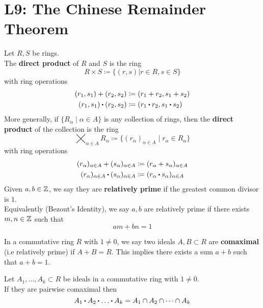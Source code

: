 \documentclass[../Main.tex]{subfiles}
\begin{document}
\chapter{L9: The Chinese Remainder Theorem}
\begin{dfn}[title = Direct Product]
	Let $R,S$ be rings.\\
	The \textbf{direct product} of $R$ and $S$ is the ring
	\[R\times S \coloneqq \{(r,s)|r\in R, s\in S \}\]
	with ring operations
	\begin{align*}
		(r_1,s_1)+(r_2,s_2)&\coloneqq (r_1+r_2,s_1+s_2)\\
		(r_1,s_1)\rdot (r_2,s_2)&\coloneqq (r_1\rdot r_2,s_1\rdot s_2)
	\end{align*}
	More generally, if $\{R_\alpha\mid \alpha\in A\}$ is any collection of rings, then the \textbf{direct product} of the collection is the ring
	\[\bigtimes_{\alpha \in A}R_\alpha \coloneqq \{(r_\alpha)_{\alpha\in A}\mid  r_\alpha \in R_\alpha\}\]
	with ring operations
	\begin{align*}
	(r_\alpha)_{\alpha\in A}+(s_\alpha)_{\alpha\in A}&\coloneqq (r_\alpha +s_\alpha)_{\alpha\in A}\\
	(r_\alpha)_{\alpha\in A}\rdot (s_\alpha)_{\alpha\in A}&\coloneqq (r_\alpha \rdot s_\alpha)_{\alpha\in A}
	\end{align*}
	Given $a,b\in \mathbb{Z}$, we say they are \textbf{relatively prime} if the greatest common divisor is $1$.\\
	Equivalently (Bezout's Identity), we say $a,b$ are relatively prime if there exists $m,n\in\mathbb{Z}$ such that \[am+bn=1\]
\end{dfn}
\begin{dfn}[title = Comaximal Ideals]
	In a commutative ring $R$ with $1\ne 0$, we say two ideals $A,B\subset R$ are \textbf{comaximal} (i.e relatively prime) if $A+B=R$. This implies there exists a sum $a+b$ such that $a+b=1$.
\end{dfn}
\begin{thm}[title = Product of pairwise comaximals is intersection]
	Let $A_1,\dots,A_k\subset R$ be ideals in a commutative ring with $1\ne 0$.\\
	If they are pairwise comaximal then
	\[A_1\rdot A_2\rdot \dots \rdot A_k = A_1 \cap A_2 \cap \dots \cap A_k\]
\end{thm}
\end{document}
